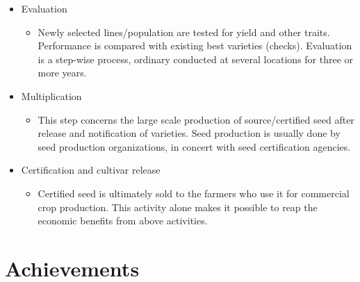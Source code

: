 \documentclass[11pt,ignorenonframetext,aspectratio=169]{beamer}
\providecommand{\tightlist}{%
  \setlength{\itemsep}{0pt}\setlength{\parskip}{0pt}}
\begin{document}
\begin{frame}{}
\protect\hypertarget{section-19}{}
\begin{itemize}
\tightlist
\item
  Evaluation

  \begin{itemize}
  \tightlist
  \item
    Newly selected lines/population are tested for yield and other
    traits. Performance is compared with existing best varieties
    (checks). Evaluation is a step-wise process, ordinary conducted at
    several locations for three or more years.
  \end{itemize}
\item
  Multiplication

  \begin{itemize}
  \tightlist
  \item
    This step concerns the large scale production of source/certified
    seed after release and notification of varieties. Seed production is
    usually done by seed production organizations, in concert with seed
    certification agencies.
  \end{itemize}
\item
  Certification and cultivar release

  \begin{itemize}
  \tightlist
  \item
    Certified seed is ultimately sold to the farmers who use it for
    commercial crop production. This activity alone makes it possible to
    reap the economic benefits from above activities.
  \end{itemize}
\end{itemize}
\end{frame}

\hypertarget{achievements}{%
\section{Achievements}\label{achievements}}
\end{document}
